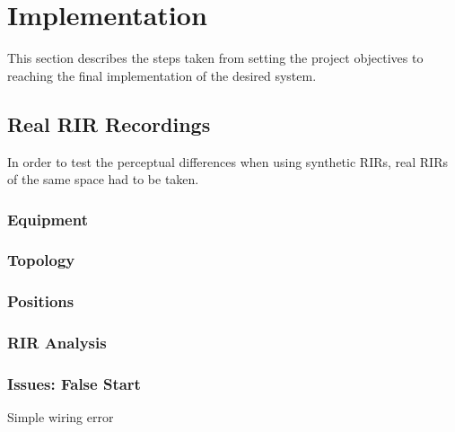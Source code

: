 \documentclass[../../main.tex]{subfiles}
\begin{document}
\section{Implementation}
	This section describes the steps taken from setting the project objectives to reaching the final implementation of the desired system.


\subsection{Real RIR Recordings}
	In order to test the perceptual differences when using synthetic RIRs, real RIRs of the same space had to be taken.

	\subsubsection{Equipment}

	\subsubsection{Topology}

	\subsubsection{Positions}

	\subsubsection{RIR Analysis}

	\subsubsection{Issues: False Start}
		Simple wiring error
\end{document}
